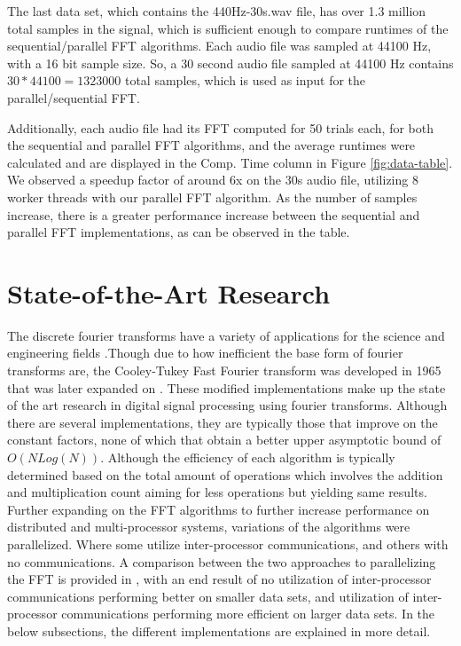 \documentclass[journal]{IEEEtran}
\begin{document}
	\vspace{1em}
	\par{
		The last data set, which contains the 440Hz-30s.wav file, has over
		1.3 million total samples in the signal, which is sufficient enough
		to compare runtimes of the sequential/parallel FFT algorithms. Each
		audio file was sampled at 44100 Hz, with a 16 bit sample size. So, a 30
		second audio file sampled at 44100 Hz contains $30 * 44100 = 1323000$
		total samples, which is used as input for the parallel/sequential FFT.
	}
	\par{
		Additionally, each audio file had its FFT computed for 50 trials each, 
		for both the sequential and parallel FFT algorithms, and the 
		average runtimes were calculated and are displayed in the Comp. Time 
		column in Figure \ref{fig:data-table}. We observed a speedup factor of 
		around 6x on the 30s audio file, utilizing 8 worker threads with our 
		parallel FFT algorithm. As the number of samples increase, 
		there is a greater performance increase between the sequential and 
		parallel FFT implementations, as can be observed in the table.
	}

\section{State-of-the-Art Research}


	\par {
		The discrete fourier transforms have a variety of applications for the 
		science and engineering fields \cite{Xiang}.Though due to how inefficient 
		the base form of fourier transforms are, the Cooley-Tukey Fast Fourier transform 
		was developed in 1965 that was later expanded on \cite{CTA}. These modified implementations 
		make up the state of the art research in digital signal processing using fourier transforms. 
		Although there are several implementations, they are typically those that improve on the constant 
		factors, none of which that obtain a better upper asymptotic bound of ${O(N Log(N))}$. Although 
		the efficiency of each algorithm is typically determined based on the total amount of operations which 
		involves the addition and multiplication count aiming for less operations but yielding same results. 
		Further expanding on the FFT algorithms to further increase performance on distributed and multi-processor systems, variations of the algorithms 
		were parallelized. Where some utilize inter-processor communications, and others with no communications. 
		A comparison between the two approaches to parallelizing the FFT is provided in \cite{Pan}, with an 
		end result of no utilization of inter-processor communications performing better on smaller data sets, and utilization of inter-processor communications 
		performing more efficient on larger data sets. In the below subsections, the different implementations 
		are explained in more detail.
	}
\end{document}
